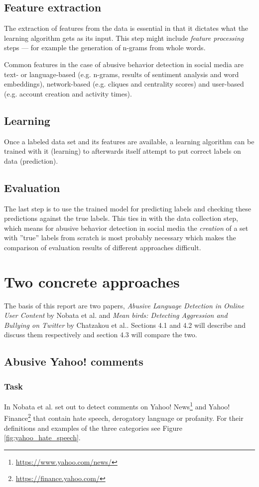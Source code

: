 \documentclass{proseminar}
\begin{document}
\subsection{Feature extraction}
The extraction of features from the data is essential in that it dictates what the learning algorithm gets as its input. This step might include \emph{feature processing} steps --- for example the generation of n-grams from whole words.

Common features in the case of abusive behavior detection in social media are text- or language-based (e.g. n-grams, results of sentiment analysis and word embeddings), network-based (e.g. cliques and centrality scores) and user-based (e.g. account creation and activity times).

\subsection{Learning}
Once a labeled data set and its features are available, a learning algorithm can be trained with it (learning) to afterwards itself attempt to put correct labels on data (prediction).

\subsection{Evaluation}
The last step is to use the trained model for predicting labels and checking these predictions against the true labels. This ties in with the data collection step, which means for abusive behavior detection in social media the \emph{creation} of a set with ''true'' labels from scratch is most probably necessary which makes the comparison of evaluation results of different approaches difficult.

\section{Two concrete approaches}
The basis of this report are two papers, \emph{Abusive Language Detection in Online User Content} by Nobata et al.\cite{Yahoo:2016} and \emph{Mean birds: Detecting Aggression and Bullying on Twitter} by Chatzakou et al.\cite{Twitter:2017}. Sections 4.1 and 4.2 will describe and discuss them respectively and section 4.3 will compare the two.

\subsection{Abusive Yahoo! comments}
\subsubsection{Task}
In \cite{Yahoo:2016} Nobata et al. set out to detect comments on Yahoo! News\footnote{\url{https://www.yahoo.com/news/}} and Yahoo! Finance\footnote{\url{https://finance.yahoo.com/}} that contain hate speech, derogatory language or profanity. For their definitions and examples of the three categories see Figure \ref{fig:yahoo_hate_speech}.
\end{document}
